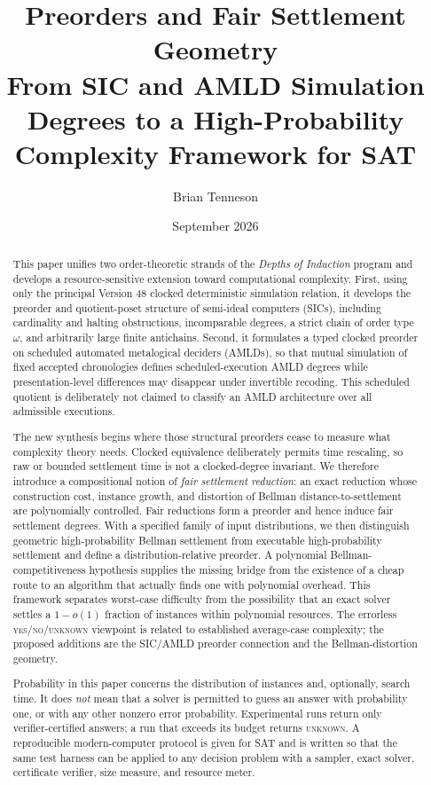 \documentclass[11pt]{article}
\title{\textbf{Preorders and Fair Settlement Geometry}\\[4pt]
\Large From SIC and AMLD Simulation Degrees to a High-Probability Complexity Framework for SAT}
\author{Brian Tenneson}
\date{September 2026}
\theoremstyle{definition}
\begin{document}
\maketitle

\begin{abstract}
This paper unifies two order-theoretic strands of the \emph{Depths of Induction} program and develops a resource-sensitive extension toward computational complexity. First, using only the principal Version 48 clocked deterministic simulation relation, it develops the preorder and quotient-poset structure of semi-ideal computers (SICs), including cardinality and halting obstructions, incomparable degrees, a strict chain of order type $\omega$, and arbitrarily large finite antichains. Second, it formulates a typed clocked preorder on scheduled automated metalogical deciders (AMLDs), so that mutual simulation of fixed accepted chronologies defines scheduled-execution AMLD degrees while presentation-level differences may disappear under invertible recoding. This scheduled quotient is deliberately not claimed to classify an AMLD architecture over all admissible executions.

The new synthesis begins where those structural preorders cease to measure what complexity theory needs. Clocked equivalence deliberately permits time rescaling, so raw or bounded settlement time is not a clocked-degree invariant. We therefore introduce a compositional notion of \emph{fair settlement reduction}: an exact reduction whose construction cost, instance growth, and distortion of Bellman distance-to-settlement are polynomially controlled. Fair reductions form a preorder and hence induce fair settlement degrees. With a specified family of input distributions, we then distinguish geometric high-probability Bellman settlement from executable high-probability settlement and define a distribution-relative preorder. A polynomial Bellman-competitiveness hypothesis supplies the missing bridge from the existence of a cheap route to an algorithm that actually finds one with polynomial overhead. This framework separates worst-case difficulty from the possibility that an exact solver settles a $1-o(1)$ fraction of instances within polynomial resources. The errorless \textsc{yes}/\textsc{no}/\textsc{unknown} viewpoint is related to established average-case complexity; the proposed additions are the SIC/AMLD preorder connection and the Bellman-distortion geometry.

Probability in this paper concerns the distribution of instances and, optionally, search time. It does \emph{not} mean that a solver is permitted to guess an answer with probability one, or with any other nonzero error probability. Experimental runs return only verifier-certified answers; a run that exceeds its budget returns \textsc{unknown}. A reproducible modern-computer protocol is given for SAT and is written so that the same test harness can be applied to any decision problem with a sampler, exact solver, certificate verifier, size measure, and resource meter.
\end{abstract}
\end{document}
